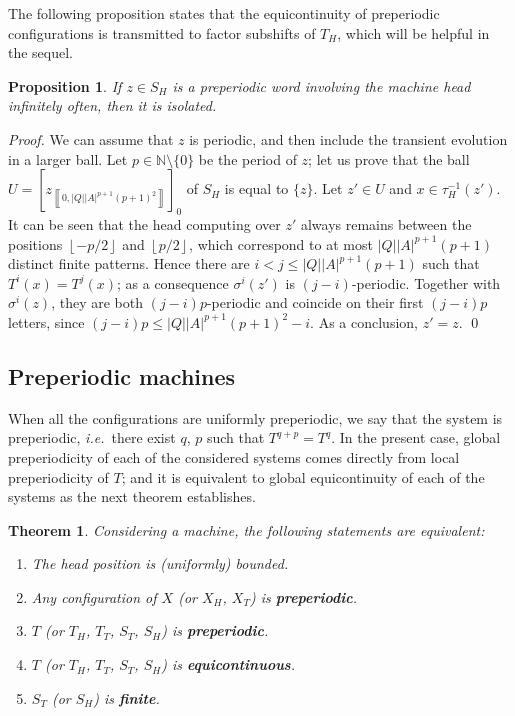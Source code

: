 \documentclass{llncs}
\newtheorem{teo}{Theorem}
\newtheorem{prop}{Proposition}
\newcommand{\Nset}{{\mathbb N}}
\newcommand{\card}[1]{\left|#1\right|}
\newcommand{\co}[2]{\left\llbracket #1,#2\right\llbracket}\newcommand{\cc}[2]{\left\llbracket #1,#2\right\rrbracket}\newcommand{\oo}[2]{\left\rrbracket #1,#2\right\llbracket}\newcommand{\oc}[2]{\left\rrbracket #1,#2\right\rrbracket}\newcommand{\ci}[1]{\co{#1}\infty}\newcommand{\io}[1]{\oo{-\infty}{#1}}\newcommand{\oi}[1]{\oo{#1}\infty}\newcommand{\ic}[1]{\oc{-\infty}{#1}}
\newcommand{\scc}[2]{_{\cc{#1}{#2}}}\newcommand{\sco}[2]{_{\co{#1}{#2}}}\newcommand{\soo}[2]{_{\oo{#1}{#2}}}\newcommand{\soc}[2]{_{\oc{#1}{#2}}}\newcommand{\sci}[1]{_{\ci{#1}}}\newcommand{\sio}[1]{_{\io{#1}}}\newcommand{\soi}[1]{_{\oi{#1}}}\newcommand{\sic}[1]{_{\ic{#1}}}
\newcommand{\ie}{\textit{i.e.}\ }
\newcommand{\ipart}[1]{\left\lfloor #1\right\rfloor}
\begin{document}
The following proposition states that the equicontinuity of preperiodic configurations is transmitted to factor subshifts of $T_H$, which will be helpful in the sequel.
\begin{prop}\label{p:shper}
 If $z\in S_H$ is a preperiodic word involving the machine head infinitely often, then it is isolated.
\end{prop}
\begin{proof}
 We can assume that $z$ is periodic, and then include the transient evolution in a larger ball.
 Let $p\in\Nset\setminus\{0\}$ be the period of $z$; let us prove that the ball $U=[z\scc0{\card Q\card A^{p+1}(p+1)^2}]_0$ of $S_H$ is equal to $\{z\}$.
 Let $z'\in U$ and $x\in\tau_H^{-1}(z')$. It can be seen that the head computing over $z'$ always remains between the positions $\ipart{-p/2}$ and $\ipart{p/2}$, which correspond to at most $\card Q\card A^{p+1}(p+1)$ distinct finite patterns. Hence there are $i<j\le\card Q\card A^{p+1}(p+1)$ such that $T^i(x)=T^j(x)$; as a consequence $\sigma^i(z')$ is $(j-i)$-periodic. Together with $\sigma^i(z)$, they are both $(j-i)p$-periodic and coincide on their first $(j-i)p$ letters, since $(j-i)p\le\card Q\card A^{p+1}(p+1)^2-i$. As a conclusion, $z'=z$.
\qed\end{proof} \subsection{Preperiodic machines}
When all the configurations are uniformly preperiodic, we say that the system is preperiodic, \ie there exist $q$, $p$ such that $T^{q+p}=T^q$.
In the present case, global preperiodicity of each of the considered systems comes directly from local preperiodicity of $T$; and it is equivalent to global equicontinuity of each of the systems as the next theorem establishes.
\begin{teo}
Considering a machine, the following statements are equivalent:
\begin{enumerate}
 \item\label{bounded} The head position is (uniformly) bounded.
\item Any configuration of $X$ (or $X_H$, $X_T$) is {\bf preperiodic}.
 \item\label{prep}$T$ (or $T_H$, $T_T$, $S_T$, $S_H$) is {\bf preperiodic}.
 \item\label{equi}$T$ (or $T_H$, $T_T$, $S_T$, $S_H$) is {\bf equicontinuous}.
 \item\label{finite} $S_T$ (or $S_H$) is {\bf finite}.
\end{enumerate}
\end{teo}
\end{document}

